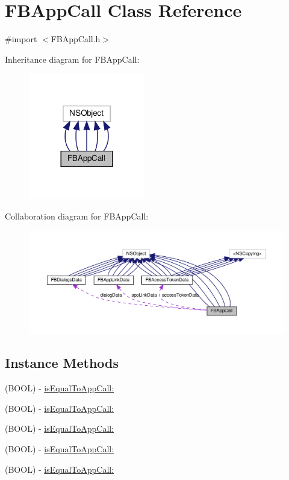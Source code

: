 \hypertarget{interfaceFBAppCall}{}\section{F\+B\+App\+Call Class Reference}
\label{interfaceFBAppCall}


{\ttfamily \#import $<$F\+B\+App\+Call.\+h$>$}



Inheritance diagram for F\+B\+App\+Call\+:
\nopagebreak
\begin{figure}[H]
\begin{center}
\leavevmode
\includegraphics[width=144pt]{interfaceFBAppCall__inherit__graph}
\end{center}
\end{figure}


Collaboration diagram for F\+B\+App\+Call\+:
\nopagebreak
\begin{figure}[H]
\begin{center}
\leavevmode
\includegraphics[width=350pt]{interfaceFBAppCall__coll__graph}
\end{center}
\end{figure}
\subsection*{Instance Methods}
\begin{DoxyCompactItemize}
\item 
(B\+O\+OL) -\/ \hyperlink{interfaceFBAppCall_a4baed85de4c4f827874a7db76a2040b3}{is\+Equal\+To\+App\+Call\+:}
\item 
(B\+O\+OL) -\/ \hyperlink{interfaceFBAppCall_a4baed85de4c4f827874a7db76a2040b3}{is\+Equal\+To\+App\+Call\+:}
\item 
(B\+O\+OL) -\/ \hyperlink{interfaceFBAppCall_a4baed85de4c4f827874a7db76a2040b3}{is\+Equal\+To\+App\+Call\+:}
\item 
(B\+O\+OL) -\/ \hyperlink{interfaceFBAppCall_a4baed85de4c4f827874a7db76a2040b3}{is\+Equal\+To\+App\+Call\+:}
\item 
(B\+O\+OL) -\/ \hyperlink{interfaceFBAppCall_a4baed85de4c4f827874a7db76a2040b3}{is\+Equal\+To\+App\+Call\+:}
\end{DoxyCompactItemize}
